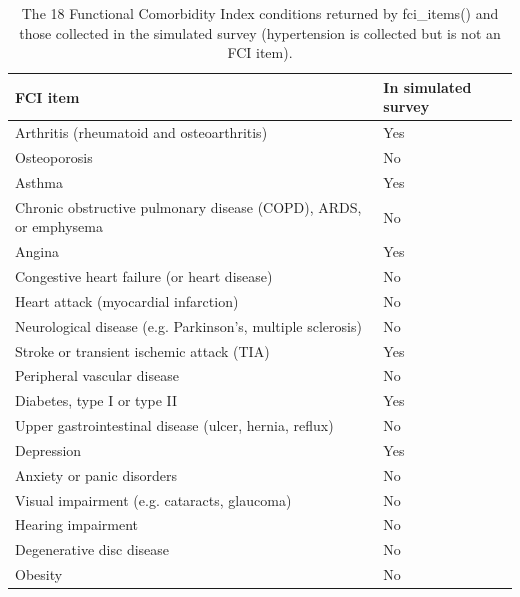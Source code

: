 \begin{table}

\caption{\label{tab:tab_fci_coverage}The 18 Functional Comorbidity Index conditions returned by fci\_items() and those collected in the simulated survey (hypertension is collected but is not an FCI item).}
\centering
\begin{tabular}[t]{ll}
\toprule
FCI item & In simulated survey\\
\midrule
Arthritis (rheumatoid and osteoarthritis) & Yes\\
Osteoporosis & No\\
Asthma & Yes\\
Chronic obstructive pulmonary disease (COPD), ARDS, or emphysema & No\\
Angina & Yes\\
Congestive heart failure (or heart disease) & No\\
Heart attack (myocardial infarction) & No\\
Neurological disease (e.g. Parkinson's, multiple sclerosis) & No\\
Stroke or transient ischemic attack (TIA) & Yes\\
Peripheral vascular disease & No\\
Diabetes, type I or type II & Yes\\
Upper gastrointestinal disease (ulcer, hernia, reflux) & No\\
Depression & Yes\\
Anxiety or panic disorders & No\\
Visual impairment (e.g. cataracts, glaucoma) & No\\
Hearing impairment & No\\
Degenerative disc disease & No\\
Obesity & No\\
\bottomrule
\end{tabular}
\end{table}

